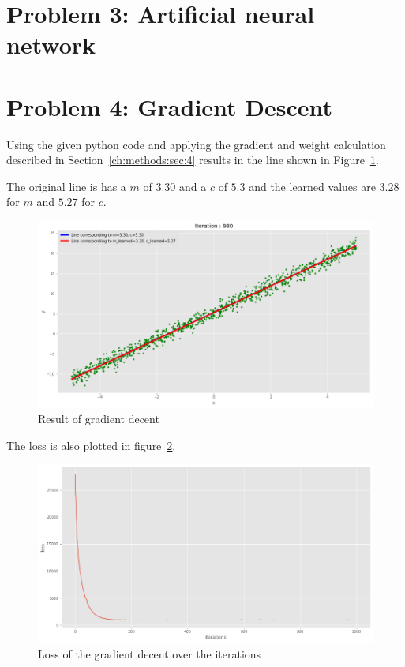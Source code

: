 \section{Problem 3: Artificial neural network}

\section{Problem 4: Gradient Descent}

Using the given python code and applying the gradient and weight calculation described in Section~\ref{ch:methods:sec:4} results in the line shown in Figure~\ref{problem4_result}.

The original line is has a $m$ of $3.30$ and a $c$ of $5.3$ and the learned values are $3.28$ for $m$ and $5.27$ for $c$.

\begin{figure}[h]
	\centering
    \includegraphics[width=17cm]{img/problem4_result.png}
	\caption{Result of gradient decent}
    \label{problem4_result}
\end{figure}

The loss is also plotted in figure~\ref{problem4_result_loss}.

\begin{figure}[h]
	\centering
    \includegraphics[width=17cm]{img/problem4_result_loss.png}
    \caption{Loss of the gradient decent over the iterations}
    \label{problem4_result_loss}
\end{figure}
